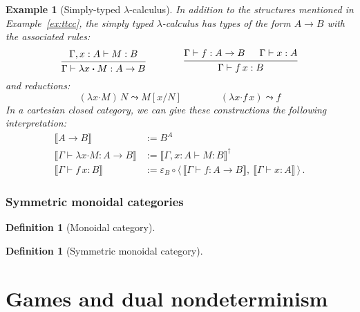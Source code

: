 \documentclass[11pt,oneside,draft]{book}
\newtheorem{example}[theorem]{Example}
\theoremstyle{definition}
\newtheorem{definition}[theorem]{Definition}
\newcommand{\bdot}{\boldsymbol{\cdot}}
\begin{document}
\begin{example}[Simply-typed $\lambda$-calculus] %
In addition to the structures mentioned in Example~\ref{ex:ttcc},
the simply typed $\lambda$-calculus has types of the form
$A \rightarrow B$ with the associated rules:
\[
  \begin{prooftree}
    \hypo{\Gamma, x:A \vdash M : B}
    \infer1{\Gamma \vdash \lambda x \bdot M : A \rightarrow B}
  \end{prooftree}
  \qquad \qquad
  \begin{prooftree}
    \hypo{\Gamma \vdash f : A \rightarrow B}
    \hypo{\Gamma \vdash x : A}
    \infer2{\Gamma \vdash f \, x : B}
  \end{prooftree}
\]
and reductions:
\[
  (\lambda x \bdot M) \, N \leadsto M[x/N]
  \qquad \qquad
  (\lambda x \bdot f \, x) \leadsto f
\]
In a cartesian closed category,
we can give these constructions the following interpretation:
\begin{align*}
  \llbracket A \rightarrow B \rrbracket &:= B^A \\
  \llbracket \Gamma \vdash \lambda x \bdot M : A \rightarrow B \rrbracket
    &:= \llbracket \Gamma, x:A \vdash M : B \rrbracket^\dagger \\
  \llbracket \Gamma \vdash f \, x : B \rrbracket &:=
    \varepsilon_B \circ
    \langle \,
      \llbracket \Gamma \vdash f : A \rightarrow B \rrbracket , \:
      \llbracket \Gamma \vdash x : A \rrbracket
    \, \rangle
  \,.
\end{align*}
\end{example}


\subsection{Symmetric monoidal categories} %

\begin{definition}[Monoidal category]
\end{definition}

\begin{definition}[Symmetric monoidal category]
\end{definition}




\chapter{Games and dual nondeterminism} \label{sec:games-dnd} %
\end{document}
